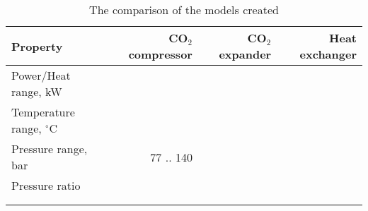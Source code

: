 \begin{table}
\label{tab:DiscussionComparison}
\caption{The comparison of the models created}
\begin{center}
\begin{tabulary}{0.9\textwidth}{LRRR}
\toprule
Property    	                &	CO$_2$ compressor   & CO$_2$	expander    & Heat exchanger    \\
\midrule
Power/Heat range, kW            &                       &                       &                   \\
Temperature range, $^\circ$C    &                       &                       &                   \\
Pressure range, bar             &   77 .. 140           &                       &                   \\
Pressure ratio                  &                       &                       &                   \\
& & & \\
& & & \\
\bottomrule
\end{tabulary}
\end{center}
\end{table}